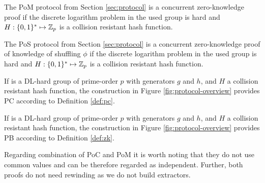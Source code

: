 \begin{lemma}\label{lem:pom2}
  The \ac{PoM} protocol from Section \ref{sec:protocol} is a concurrent zero-knowledge proof if the discrete logarithm problem in the used group \GG is hard and $H:\{0,1\}^\ast\mapsto\mathbb{Z}_p$ is a collision resistant hash function.
\end{lemma}

\begin{lemma}\label{lem:pos2}
  The \ac{PoS} protocol from Section \ref{sec:protocol} is a concurrent zero-knowledge proof of knowledge of shuffling $\phi$ if the discrete logarithm problem in the used group \GG is hard and $H:\{0,1\}^\ast\mapsto\mathbb{Z}_p$ is a collision resistant hash function.
\end{lemma}


\begin{theorem}\label{theo:pc}
  If \GG is a DL-hard group of prime-order $p$ with generators $g$ and $h$, and $H$ a collision resistant hash function, the construction in Figure \ref{fig:protocol-overview} provides \acl{PC} according to Definition \ref{def:pc}.
\end{theorem}

%
\begin{theorem}\label{theo:zk}
  If \GG is a DL-hard group of prime-order $p$ with generators $g$ and $h$, and $H$ a collision resistant hash function, the construction in Figure \ref{fig:protocol-overview} provides \acl{PB} according to Definition \ref{def:zk}.
\end{theorem}


\noindent
Regarding combination of \ac{PoC} and \ac{PoM} it is worth noting that they do not use common values and can be therefore regarded as independent.
Further, both proofs do not need rewinding as we do not build extractors.


